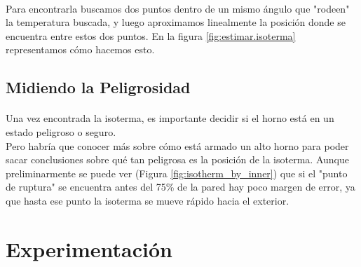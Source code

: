 \documentclass[12pt]{article}
\begin{document}
\paragraph{} Para encontrarla buscamos dos puntos dentro de un mismo ángulo que "rodeen" la temperatura buscada, y luego aproximamos linealmente la posición donde se encuentra entre estos dos puntos. En la figura \ref{fig:estimar.isoterma} representamos cómo hacemos esto.


\subsection{Midiendo la Peligrosidad}
\label{sec:peligrosidad.distance}

\paragraph{} Una vez encontrada la isoterma, es importante decidir si el horno está en un estado peligroso o seguro. \\
Pero habría que conocer más sobre cómo está armado un alto horno para poder sacar conclusiones sobre qué tan peligrosa es la posición de la isoterma. Aunque preliminarmente se puede ver (Figura \ref{fig:isotherm_by_inner}) que si el "punto de ruptura" se encuentra antes del 75\% de la pared hay poco margen de error, ya que hasta ese punto la isoterma se mueve rápido hacia el exterior.

\section{Experimentación} 

\end{document}
